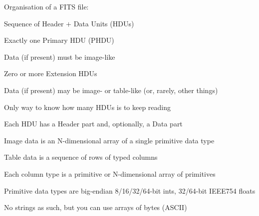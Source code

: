 \documentclass[20pt,landscape]{foils}
\begin{document}
\begin{list0}
  \item Organisation of a FITS file:
  \begin{list2}
    \item Sequence of Header $+$ Data Units (HDUs)
\vspace*{-0.2cm}
    \begin{list3}
      \item Exactly one Primary HDU (PHDU)
      \begin{list4}
\vspace*{-0.2cm}
        \item Data (if present) must be image-like
\vspace*{-0.2cm}
      \end{list4}
      \item Zero or more Extension HDUs
      \begin{list4}
\vspace*{-0.2cm}
        \item Data (if present) may be image- or table-like
              (or, rarely, other things)
\vspace*{-0.2cm}
      \end{list4}
      \item Only way to know how many HDUs is to keep reading
    \end{list3}
\vspace*{-0.2cm}
    \item Each HDU has a Header part and, optionally, a Data part
\vspace*{-0.2cm}
    \item Image data is an N-dimensional array of a single primitive data type
\vspace*{-0.2cm}
    \item Table data is a sequence of rows of typed columns 
\vspace*{-0.2cm}
    \begin{list3}
      \item Each column type is a primitive or N-dimensional array of primitives
    \end{list3}
\vspace*{-0.2cm}
    \item Primitive data types are big-endian 8/16/32/64-bit ints,
                                              32/64-bit IEEE754 floats
    \begin{list3}
      \item No strings as such, but you can use arrays of bytes (ASCII)

\end{list3}
\end{list2}
\end{list0}
\end{document}
